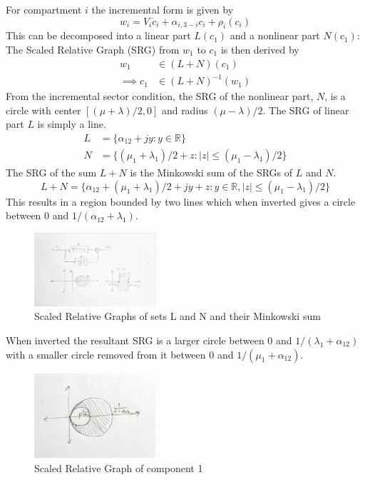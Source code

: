 \documentclass{article}
\begin{document}
For compartment $i$ the incremental form is given by
\begin{equation}
    w_i = V_i \dot{c}_i + \alpha_{i,3-i} c_i + \rho_i(c_i)
\end{equation}
This can be decomposed into a linear part $L(c_1)$ and a nonlinear part $N(c_1)$:
The Scaled Relative Graph (SRG) from $w_1$ to $c_1$ is then derived by
\begin{align}
    w_1 &\in (L + N)(c_1) \\
    \implies c_1 &\in (L + N)^{-1}(w_1) 
\end{align}
From the incremental sector condition, the SRG of the nonlinear part, $N$, is a circle with center $[(\mu+\lambda)/2, 0]$ and radius $(\mu-\lambda)/2$.
The SRG of linear part $L$ is simply a line.
\begin{align}
    L &= \{ \alpha_{12} + j y : y \in \mathbb{R} \} \\
    N &= \{ (\mu_1 + \lambda_1)/2 + z : |z| \leq (\mu_1 - \lambda_1)/2 \}
\end{align}
The SRG of the sum $L + N$ is the Minkowski sum of the SRGs of $L$ and $N$.
\begin{equation}
    L + N = \{ \alpha_{12} + (\mu_1 + \lambda_1)/2 + jy + z : y \in \mathbb{R}, |z| \leq (\mu_1 - \lambda_1)/2 \}
\end{equation}
This results in a region bounded by two lines which when inverted gives a circle between 0 and $1/(\alpha_{12} + \lambda_1)$.

\begin{figure}[H]
    \centering
    \includegraphics[width=0.4\textwidth]{figures/componentSRGs.jpg}
    \caption{Scaled Relative Graphs of sets L and N and their Minkowski sum}
\end{figure}
When inverted the resultant SRG is a larger circle between 0 and $1/(\lambda_1 + \alpha_{12})$ with a smaller circle removed from it between 0 and $1/(\mu_1 + \alpha_{12})$.
\begin{figure}[H]
    \centering
    \includegraphics[width=0.4\textwidth]{figures/compartmentSRG.jpg}
    \caption{Scaled Relative Graph of component 1}
    \label{fig:compartment_srg}
\end{figure}
\end{document}
